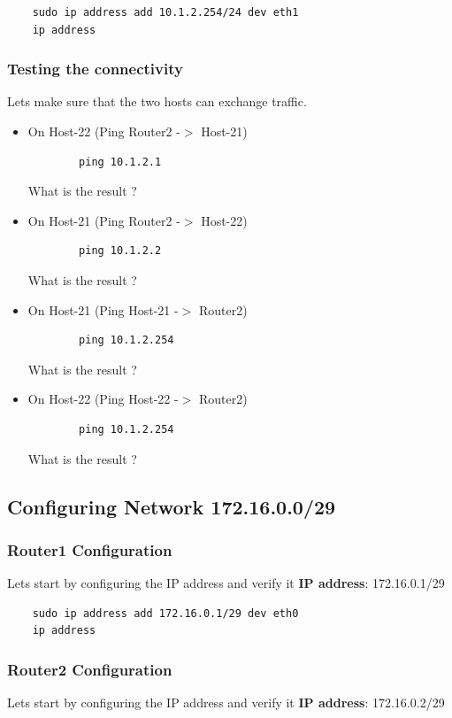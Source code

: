 \begin{verbatim}
    sudo ip address add 10.1.2.254/24 dev eth1
    ip address
\end{verbatim}

\subsubsection{Testing the connectivity}
Lets make sure that the two hosts can exchange traffic.
\newline
\begin{itemize}
	\item On Host-22 (Ping Router2 -$>$ Host-21)
	\begin{verbatim}
	    ping 10.1.2.1
	\end{verbatim}

	What is the result ?
	\item On Host-21 (Ping Router2 -$>$ Host-22)
	\begin{verbatim}
	    ping 10.1.2.2
	\end{verbatim}

	What is the result ?
	\item On Host-21 (Ping Host-21 -$>$ Router2)
	\begin{verbatim}
	    ping 10.1.2.254
	\end{verbatim}

	What is the result ?
	\item On Host-22 (Ping Host-22 -$>$ Router2)
	\begin{verbatim}
	    ping 10.1.2.254
	\end{verbatim}

	What is the result ?
\end{itemize}

\subsection{Configuring Network 172.16.0.0/29}

\subsubsection{Router1 Configuration}
Lets start by configuring the IP address and verify it
\textbf{IP address}: 172.16.0.1/29

\begin{verbatim}
    sudo ip address add 172.16.0.1/29 dev eth0
    ip address
\end{verbatim}

\subsubsection{Router2 Configuration}
Lets start by configuring the IP address and verify it
\textbf{IP address}: 172.16.0.2/29

